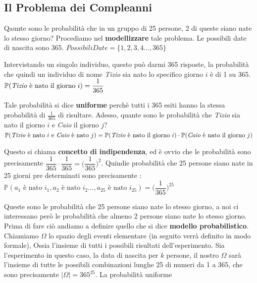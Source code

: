 \documentclass[12pt, letterpaper]{article}
\begin{document}
\subsection{Il Problema dei Compleanni}
Qaunte sono le probabilità che in un gruppo di 25 persone, 2 di queste siano nate lo stesso giorno? 
Procediamo nel \textbf{modellizzare} tale problema.
Le possibili date di nascita sono 365. 
\centering\(PossibiliDate=\{1,2,3,4...,365\}\)\\
\raggedright Intervistando un singolo individuo, questo può darmi 365 risposte, la probabilità che quindi
un individuo di nome \textit{Tizio} sia nato lo specifico giorno \(i\) è di 1 su 365.\\
\centering\( \mathbb{P}(\text{\textit{Tizio} è nato il giorno } i) = \dfrac{1}{365} \)\\
\raggedright Tale probabilità si dice \textbf{uniforme} perchè tutti i 365 esiti hanno la stessa
probabilità di \(\frac{1}{365}\) di risultare.
Adesso, quante sono le probabilità che \textit{Tizio} sia nato il giorno \(i\) e \textit{Caio}
il giorno \(j\)?\\
\centering\( \mathbb{P}(\text{\textit{Tizio} è nato } i \text{ e \textit{Caio} è nato } j) = \mathbb{P}(\text{\textit{Tizio} è nato il giorno } i) \cdot \mathbb{P}(\text{\textit{Caio} è nato il giorno } j) \)\\
\raggedright Questo si chiama \textbf{concetto di indipendenza}, ed è ovvio che le probabilità sono precisamente \(\dfrac{1}{365}\cdot\dfrac{1}{365} = \bigg( \dfrac{1}{365}\bigg)^2 \).
Quindie probabilità che 25 persone siano nate in 25 giorni pre determinati sono precisamente : \\
\centering\( \mathbb{P}( a_1 \text{ è nato } i_1,a_2 \text{ è nato } i_2...,a_{25} \text{ è nato } i_{25}) = \bigg( \dfrac{1}{365}\bigg)^{25} \)\\
\raggedright
Queste sono le probabilità che 25 persone siano nate lo stesso giorno, a noi ci interessano però
le probabilità che almeno 2 persone siano nate lo stesso giorno. Prima di fare ciò andiamo a definire
quello che si dice \textbf{modello probabilistico}.\\
Chiamiamo \(\Omega\) lo spazio degli eventi elementare (in seguito verrà definito in modo formale), 
Ossia l'insieme di tutti i possibili risultati dell'esperimento. Sia l'esperimento in questo caso, la 
data di nascita per \(k\) persone, il nostro \(\Omega\)  sarà l'insieme di tutte le possibili combinazioni 
lunghe 25 di  numeri da 1 a 365, che sono precisamente \(|\Omega|=365^{25}\). La probabilità uniforme
\end{document}
